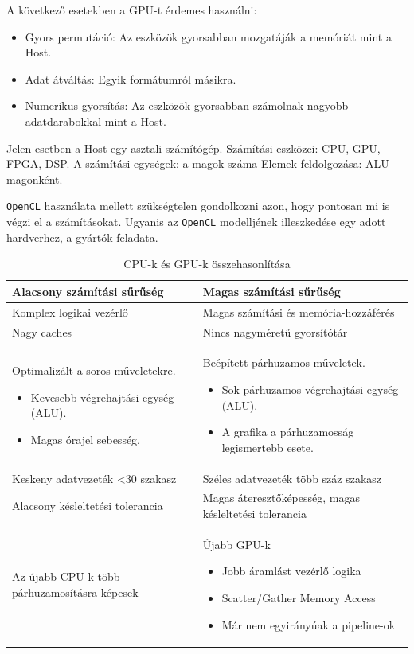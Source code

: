 A következő esetekben a GPU-t érdemes használni:
\begin{itemize}
\item Gyors permutáció: Az eszközök gyorsabban mozgatáják a memóriát mint a Host.
\item Adat átváltás: Egyik formátumról másikra.
\item Numerikus gyorsítás: Az eszközök gyorsabban számolnak nagyobb adatdarabokkal mint a Host.
\end{itemize}
Jelen esetben a Host egy asztali számítógép.
Számítási eszközei: CPU, GPU, FPGA, DSP.
A számítási egységek: a magok száma
Elemek feldolgozása: ALU magonként.

\texttt{OpenCL} használata mellett szükségtelen gondolkozni azon, hogy pontosan mi is végzi el a számításokat. Ugyanis az \texttt{OpenCL} modelljének illeszkedése egy adott hardverhez, a gyártók feladata.

\begin{table}[h!]
\centering
\caption{CPU-k és GPU-k összehasonlítása}
\medskip
\label{tab:cpuvsgpu}
\begin{tabular}{|p{7cm}|p{7cm}|}
\hline
Alacsony számítási sűrűség & Magas számítási sűrűség \\
\hline
Komplex logikai vezérlő & Magas számítási és memória-hozzáférés \\
\hline
Nagy caches & Nincs nagyméretű gyorsítótár  \\
\hline
Optimalizált a soros műveletekre.
\begin{itemize}
	\item Kevesebb végrehajtási egység (ALU).
	\item Magas órajel sebesség.
\end{itemize} & Beépített párhuzamos műveletek.
\begin{itemize}
	\item Sok párhuzamos végrehajtási egység (ALU).
	\item A grafika a párhuzamosság legismertebb esete.
\end{itemize} \\
\hline
Keskeny adatvezeték <30 szakasz & Széles adatvezeték több száz szakasz \\
\hline
Alacsony késleltetési tolerancia & Magas áteresztőképesség, magas késleltetési tolerancia \\
\hline
Az újabb CPU-k több párhuzamosításra képesek & Újabb GPU-k
\begin{itemize}
	\item Jobb áramlást vezérlő logika
	\item Scatter/Gather Memory Access
	\item Már nem egyirányúak a pipeline-ok
\end{itemize} \\
\hline
\end{tabular}
\end{table}

